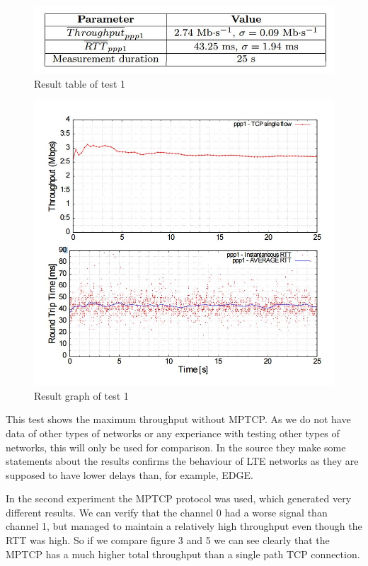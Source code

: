 \documentclass[11pt,twocolumn]{article}
\begin{document}
\begin{figure}[ht]
\begin{center}
\includegraphics[scale=0.5]{table_1}
\caption{Result table of test 1}
\end{center}
\end{figure}
\begin{figure}[ht]
\begin{center}
\includegraphics[scale=0.5]{graph_1}
\caption{Result graph of test 1}
\end{center}
\end{figure}

This test shows the maximum throughput without MPTCP. As we do not have data of other types of networks or any experiance with testing other types of networks, this will only be used for comparison. In the source they make some statements about the results confirms the behaviour of LTE networks as they are supposed to have lower delays than, for example, EDGE. 

In the second experiment the MPTCP protocol was used, which generated very different results. We can verify that the channel 0 had a worse signal than channel 1, but managed to maintain a relatively high throughput even though the RTT was high. So if we compare figure 3 and 5 we can see clearly that the MPTCP has a much higher total throughput than a single path TCP connection.
\end{document}

